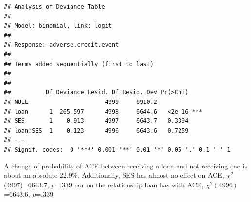 \documentclass[]{article}
\begin{document}
\begin{verbatim}
## Analysis of Deviance Table
## 
## Model: binomial, link: logit
## 
## Response: adverse.credit.event
## 
## Terms added sequentially (first to last)
## 
## 
##          Df Deviance Resid. Df Resid. Dev Pr(>Chi)    
## NULL                      4999     6910.2             
## loan      1  265.597      4998     6644.6   <2e-16 ***
## SES       1    0.913      4997     6643.7   0.3394    
## loan:SES  1    0.123      4996     6643.6   0.7259    
## ---
## Signif. codes:  0 '***' 0.001 '**' 0.01 '*' 0.05 '.' 0.1 ' ' 1
\end{verbatim}

A change of probability of ACE between receiving a loan and not
receiving one is about an absolute 22.9\%. Additionally, SES has almost
no effect on ACE, \(\chi^2\)(4997)=6643.7, \(p\)=.339 nor on the
relationship loan has with ACE, \(\chi^2(4996)\)=6643.6, \(p\)=.339.
\end{document}
